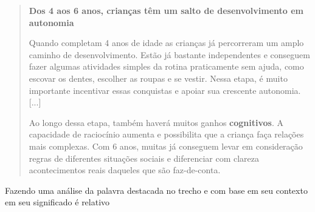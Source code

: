 \begin{quote}
\textbf{Dos 4 aos 6 anos, crianças têm um salto de desenvolvimento em autonomia}

Quando completam 4 anos de idade as crianças já percorreram um amplo
caminho de desenvolvimento. Estão já bastante independentes e conseguem
fazer algumas atividades simples da rotina praticamente sem ajuda, como
escovar os dentes, escolher as roupas e se vestir. Nessa etapa, é muito
importante incentivar essas conquistas e apoiar sua crescente autonomia.
{[}...{]}

Ao longo dessa etapa, também haverá muitos ganhos \textbf{cognitivos}. A
capacidade de raciocínio aumenta e possibilita que a criança faça
relações mais complexas. Com 6 anos, muitas já conseguem levar em
consideração regras de diferentes situações sociais e diferenciar com
clareza acontecimentos reais daqueles que são faz-de-conta.

\end{quote}

Fazendo uma análise da palavra destacada no trecho e com base em seu
contexto em seu significado é relativo

